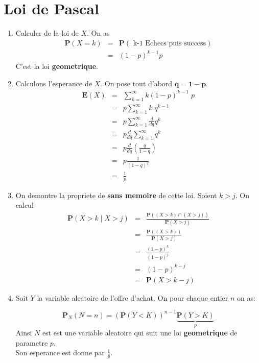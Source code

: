 \documentclass[a4paper]{tufte-handout}
\begin{document}
\section{Loi de Pascal}

\begin{enumerate}
  \item Calculer de la loi de $X$.
    On as 
    \begin{eqnarray*} 
      \mathbf{P}(X = k) &=& \mathbf{P}(\text{ k-1 Echecs puis success})\\
                        &=& (1-p)^{k-1}p
    \end{eqnarray*}
    C'est la loi \textbf{geometrique}.
  \item Calculons l'esperance de $X$. On pose tout d'abord $\mathbf{q = 1-p}$.
    \begin{eqnarray*}
      \mathbf{E}(X) &=& \sum_{k=1}^\infty k (1-p)^{k-1}\;p\\
                    &=& p \sum_{k=1}^\infty k\;q^{k-1}\\
                    &=& p \sum_{k=1}^\infty \frac{d}{dq}q^k\\
                    &=& p \frac{d}{dq} \sum_{k=1}^\infty q^k\\
                    &=& p \frac{d}{dq}\left(\frac{q}{1-q}\right)\\
                    &=& p \frac{1}{(1-q)^2}\\
                    &=& \frac{1}{p}
    \end{eqnarray*}
  \item On demontre la propriete de \textbf{sans memoire} de cette loi. Soient
    $k > j $.  On calcul
    \begin{eqnarray*}
      \mathbf{P}(X > k \;|\; X > j) &=& \frac{\mathbf{P}\left( (X>k) \cap (X >
      j)\right)}{\mathbf{P}(X > j)}\\[4pt]
       &=& \frac{\mathbf{P}\left( (X>k)\right)}{\mathbf{P}(X > j)}\\[4pt]
       &=& \frac{(1-p)^k}{(1-p)^j}\\
       &=& (1-p)^{k-j}\\
       &=& \mathbf{P}(X > k -j)
    \end{eqnarray*}
  \item Soit $Y$ la variable aleatoire de l'offre d'achat. On pour chaque entier
    $n$ on as:

    $$
    \mathbf{P}_N(N = n) = \left(\mathbf{P}(Y < K)\right)^{n-1}\underbrace{\mathbf{P}\left(Y>K\right)}_{p}
    $$
    Ainsi $N$ est est une variable aleatoire qui suit une loi
    \textbf{geometrique} de parametre $p$.\\

  Son esperance est donne par $\frac{1}{p}$.
\end{enumerate}
\end{document}
